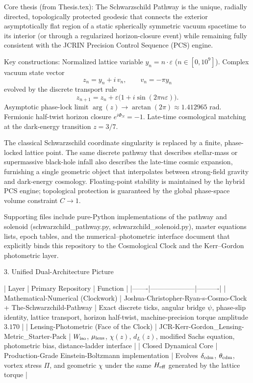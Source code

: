 Core thesis (from Thesis.tex):  
The Schwarzschild Pathway is the unique, radially directed, topologically protected geodesic that connects the exterior asymptotically flat region of a static spherically symmetric vacuum spacetime to its interior (or through a regularized horizon-closure event) while remaining fully consistent with the JCRIN Precision Control Sequence (PCS) engine.

Key constructions:
Normalized lattice variable \(y_n = n\cdot\varepsilon\) (\(n\in[0,10^9]\)).
Complex vacuum state vector
  \[
  z_n = y_n + i\,v_n,\qquad v_n = -\pi y_n
  \]
  evolved by the discrete transport rule
  \[
  z_{n+1} = z_n + \varepsilon\bigl(1 + i\sin(2\pi n\varepsilon)\bigr).
  \]
Asymptotic phase-lock limit \(\arg(z)\to\arctan(2\pi)\approx 1.412965\) rad.
Fermionic half-twist horizon closure \(e^{i\Phi_N}=-1\).
Late-time cosmological matching at the dark-energy transition \(z=3/7\).

The classical Schwarzschild coordinate singularity is replaced by a finite, phase-locked lattice point. The same discrete pathway that describes stellar-mass or supermassive black-hole infall also describes the late-time cosmic expansion, furnishing a single geometric object that interpolates between strong-field gravity and dark-energy cosmology. Floating-point stability is maintained by the hybrid PCS engine; topological protection is guaranteed by the global phase-space volume constraint \(C\to 1\).

Supporting files include pure-Python implementations of the pathway and solenoid (schwarzchild_pathway.py, schwarzchild_solenoid.py), master equations lists, epoch tables, and the numerical–photometric interface document that explicitly binds this repository to the Cosmological Clock and the Kerr–Gordon photometric layer.

3. Unified Dual-Architecture Picture

| Layer | Primary Repository | Function |
|-------|--------------------|----------|
| Mathematical-Numerical (Clockwork) | Joshua-Christopher-Ryan-s-Cosmo-Clock + The-Schwarzchild-Pathway | Exact discrete ticks, angular bridge \(\psi\), phase-slip identity, lattice transport, horizon half-twist, machine-precision torque amplitude \(3.170\) |
| Lensing-Photometric (Face of the Clock) | JCR-Kerr-Gordon_Lensing-Metric_Starter-Pack | \(W_{\rm iso}\), \(\mu_{\rm lens}\), \(\chi(z)\), \(d_L(z)\), modified Sachs equation, photometric bias, distance-ladder interface |
| Closed Dynamical Core | Production-Grade Einstein-Boltzmann implementation | Evolves \(\delta_{\rm cdm}\), \(\theta_{\rm cdm}\), vortex stress \(\Pi\), and geometric \(\chi\) under the same \(H_{\rm eff}\) generated by the lattice torque |

